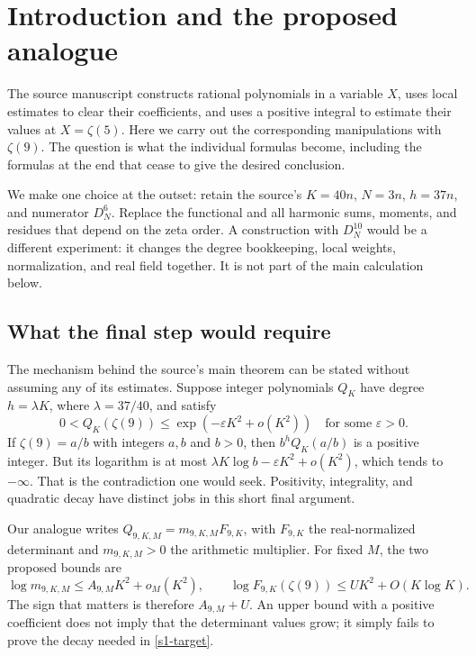 \section{Introduction and the proposed analogue}
\label{s1-introduction}

The source manuscript \cite{F} constructs rational polynomials in a
variable $X$, uses local estimates to clear their coefficients, and uses
a positive integral to estimate their values at $X=\zeta(5)$. Here we
carry out the corresponding manipulations with $\zeta(9)$. The question
is what the individual formulas become, including the formulas at the
end that cease to give the desired conclusion.

We make one choice at the outset: retain the source's
$K=40n$, $N=3n$, $h=37n$, and numerator $D_N^6$. Replace the functional
and all harmonic sums, moments, and residues that depend on the zeta
order. A construction with $D_N^{10}$ would be a different experiment:
it changes the degree bookkeeping, local weights, normalization, and
real field together. It is not part of the main calculation below.

\subsection{What the final step would require}

The mechanism behind the source's main theorem can be stated without
assuming any of its estimates. Suppose integer polynomials $Q_K$ have
degree $h=\lambda K$, where $\lambda=37/40$, and satisfy
\begin{equation}
 0<Q_K(\zeta(9))\leq \exp(-\varepsilon K^2+o(K^2))
 \quad\text{for some }\varepsilon>0.
 \label{s1-target}
\end{equation}
If $\zeta(9)=a/b$ with integers $a,b$ and $b>0$, then
$b^hQ_K(a/b)$ is a positive integer. But its logarithm is at most
$\lambda K\log b-\varepsilon K^2+o(K^2)$, which tends to $-\infty$.
That is the contradiction one would seek. Positivity, integrality, and
quadratic decay have distinct jobs in this short final argument.

Our analogue writes $Q_{9,K,M}=m_{9,K,M}F_{9,K}$, with $F_{9,K}$ the
real-normalized determinant and $m_{9,K,M}>0$ the arithmetic multiplier.
For fixed $M$, the two proposed bounds are
\begin{equation}
 \log m_{9,K,M}\leq A_{9,M}K^2+o_M(K^2),\qquad
 \log F_{9,K}(\zeta(9))\leq UK^2+O(K\log K).
 \label{s1-two-bounds}
\end{equation}
The sign that matters is therefore $A_{9,M}+U$. An upper bound with a
positive coefficient does not imply that the determinant values grow;
it simply fails to prove the decay needed in \eqref{s1-target}.


